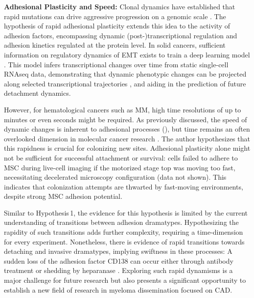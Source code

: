 \textbf{Adhesional Plasticity and Speed:}
Clonal dynamics have established that rapid mutations can drive aggressive
progression on a genomic scale \cite{keatsClonalCompetitionAlternating2012,
      eversPrognosticValueExtracellular2023}. The hypothesis of rapid adhesional
plasticity extends this idea to the activity of adhesion factors, encompassing
dynamic (post-)transcriptional regulation and adhesion kinetics regulated at the
protein level. In solid cancers, sufficient information on regulatory dynamics
of \ac{EMT} exists to train a deep learning model
\cite{tongLearningTranscriptionalRegulatory2023}. This model infers
transcriptional changes over time from static single-cell RNAseq data,
demonstrating that dynamic phenotypic changes can be projected along selected
transcriptional trajectories , and aiding in the
prediction of future detachment dynamics.


However, for hematological cancers such as MM, high time resolutions of up to
minutes or even seconds might be required. As previously discussed, the speed of
dynamic changes is inherent to adhesional processes
(), but time remains an often
overlooked dimension in molecular cancer research%
\cite{uthamacumaranReviewMathematicalComputational2022}. The author hypothesizes
that this rapidness is crucial for colonizing new sites. Adhesional plasticity
alone might not be sufficient for successful attachment or survival: \INA cells
failed to adhere to \ac{MSC} during live-cell imaging if the motorized stage top
was moving too fast, necessitating decelerated microscopy configuration (data
not shown). This indicates that colonization attempts are thwarted by
fast-moving environments, despite strong \ac{MSC} adhesion potential.

Similar to Hypothesis\,1, the evidence for this hypothesis is limited by the
current understanding of transitions between adhesion dramatypes. Hypothesizing
the rapidity of such transitions adds further complexity, requiring a
time-dimension for every experiment. Nonetheless, there is evidence of rapid
transitions towards detaching and invasive dramatypes, implying swiftness in
these processes: A sudden loss of the adhesion factor CD138 can
occur either through antibody treatment or shedding by heparanase
\cite{yangHeparanasePromotesSpontaneous2005,
      akhmetzyanovaDynamicCD138Surface2020}. Exploring such rapid dynamisms is a major
challenge for future research but also presents a significant opportunity to
establish a new field of research in myeloma dissemination focused on \ac{CAD}.


